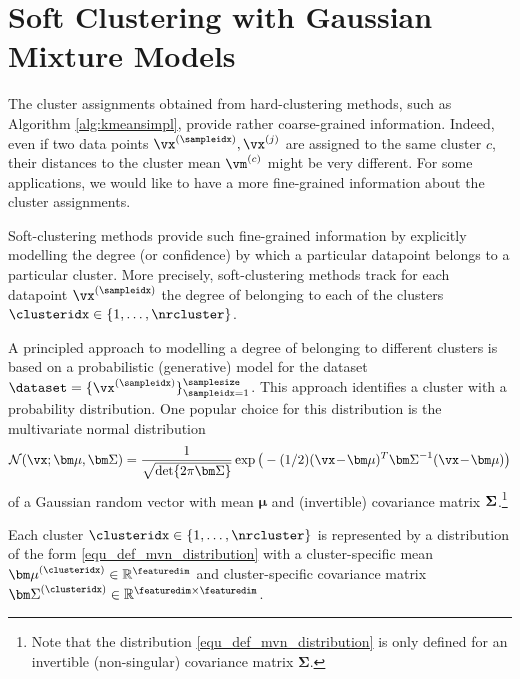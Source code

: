 \documentclass[12pt]{report}
\begin{document}
\section{Soft Clustering with Gaussian Mixture Models}
\label{sec_soft_clustering}

The cluster assignments obtained from hard-clustering 
methods, such as Algorithm \ref{alg:kmeansimpl}, provide 
rather coarse-grained information. Indeed, even if two data 
points $\vx^{(\sampleidx)}, \vx^{(j)}$ are assigned to the 
same cluster $c$, their distances to the cluster mean $\vm^{(c)}$ 
might be very different. For some applications, we would 
like to have a more fine-grained information about the cluster 
assignments. 

Soft-clustering methods provide such fine-grained information 
by explicitly modelling the degree (or confidence) by which 
a particular datapoint belongs to a particular cluster. More 
precisely, soft-clustering methods track for each datapoint 
$\vx^{(\sampleidx)}$ the degree of belonging to each of the 
clusters $\clusteridx \in \{1,\ldots,\nrcluster\}$.  

A principled approach to modelling a degree of belonging to 
different clusters is based on a probabilistic (generative) model 
for the dataset $\dataset = \{ \vx^{(\sampleidx)} \}_{\sampleidx=1}^{\samplesize}$. 
This approach identifies a cluster with a probability distribution. 
One popular choice for this distribution is the multivariate normal 
distribution 
\begin{equation}
\label{equ_def_mvn_distribution}
 \mathcal{N} (\vx ; {\bm \mu}, {\bm \Sigma}) = \frac{1}{\sqrt{{\rm det } \{ 2 \pi  {\bm \Sigma} \} }} \exp\big( - (1/2) (\vx\!-\!{\bm \mu})^{T}  {\bm \Sigma}^{-1} (\vx\!-\!{\bm \mu})  \big)
\end{equation} 
of a Gaussian random vector with mean ${\bm \mu}$ and (invertible) covariance 
matrix ${\bf \Sigma}$.\footnote{Note that the distribution \eqref{equ_def_mvn_distribution} 
is only defined for an invertible (non-singular) covariance matrix ${\bm \Sigma}$.}

Each cluster $\clusteridx \in \{1,\ldots,\nrcluster\}$ is represented by a distribution 
of the form \eqref{equ_def_mvn_distribution} with a cluster-specific mean 
${\bm \mu}^{(\clusteridx)} \in \mathbb{R}^{\featuredim}$ and cluster-specific 
covariance matrix ${\bm \Sigma}^{(\clusteridx)} \in \mathbb{R}^{\featuredim \times \featuredim}$. 
\end{document}
